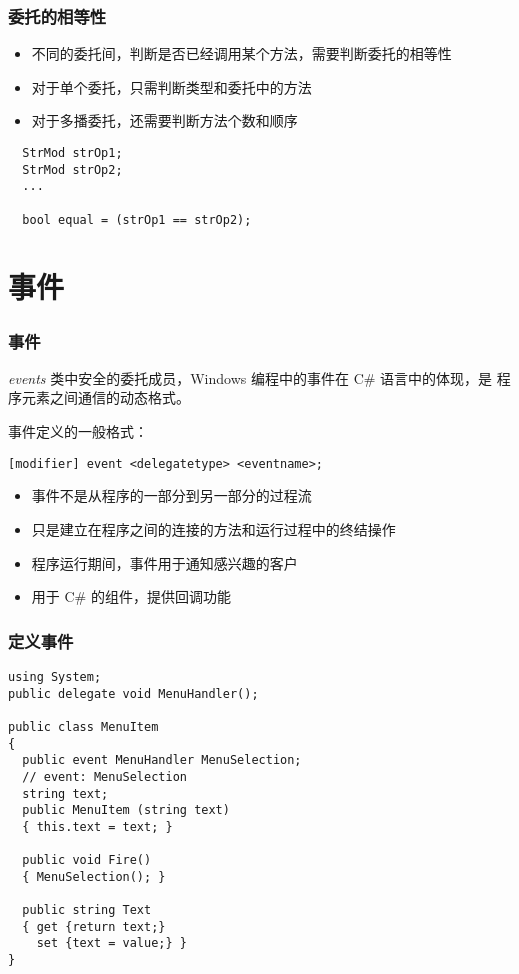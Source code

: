 \begin{frame}[fragile]
\frametitle{委托的相等性}
\begin{itemize}
\item 不同的委托间，判断是否已经调用某个方法，需要判断委托的相等性
\item 对于单个委托，只需判断类型和委托中的方法
\item 对于多播委托，还需要判断方法个数和顺序
\end{itemize}
\begin{lstlisting}
  StrMod strOp1;
  StrMod strOp2;
  ...

  bool equal = (strOp1 == strOp2);

\end{lstlisting}
\end{frame}



\section{事件}

\begin{frame}[fragile]
\frametitle{事件}
\begin{block}{\textit{events}}
  \CJKindent 类中安全的委托成员，Windows 编程中的事件在 C\# 语言中的体现，是
  程序元素之间通信的动态格式。
\end{block}
事件定义的一般格式：
\begin{lstlisting}
[modifier] event <delegatetype> <eventname>;
\end{lstlisting}
\begin{itemize}
\item 事件不是从程序的一部分到另一部分的过程流
\item 只是建立在程序之间的连接的方法和运行过程中的终结操作
\item 程序运行期间，事件用于通知感兴趣的客户
\item 用于 C\# 的组件，提供回调功能
\end{itemize}
\end{frame}

\begin{frame}[fragile]
\frametitle{定义事件}
\begin{lstlisting}
using System;
public delegate void MenuHandler();

public class MenuItem
{
  public event MenuHandler MenuSelection;
  // event: MenuSelection
  string text;
  public MenuItem (string text)
  { this.text = text; }

  public void Fire()
  { MenuSelection(); }

  public string Text
  { get {return text;}
    set {text = value;} }
}
\end{lstlisting}

\end{frame}

